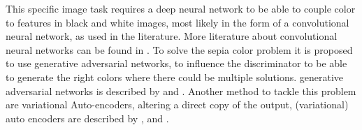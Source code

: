 This specific image task requires a deep neural network to be able to couple color to features in black and white images, most likely in the form of a convolutional neural network, as used in the literature. More literature about convolutional neural networks can be found in \cite{GoodfellowBOOK}. To solve the sepia color problem it is proposed to use generative adversarial networks, to influence the discriminator to be able to generate the right colors where there could be multiple solutions. generative adversarial networks is described by \cite{Goodfellow} and \cite{Radford}. Another method to tackle this problem are variational Auto-encoders, altering a direct copy of the output, (variational) auto encoders are described by \cite{Gregor}, \cite{Kingma} and \cite{GoodfellowBOOK}.










